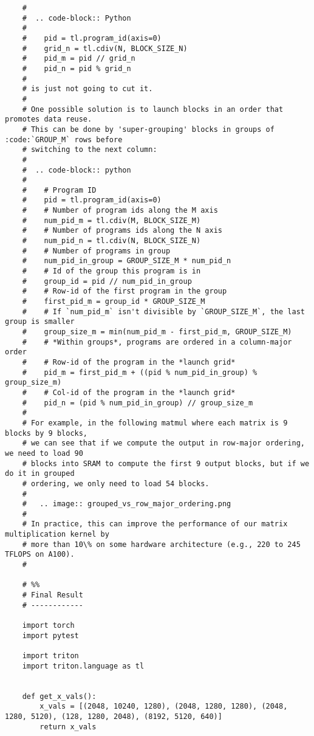 \documentclass{article}
\begin{document}
\begin{lstlisting}
    #
    #  .. code-block:: Python
    #
    #    pid = tl.program_id(axis=0)
    #    grid_n = tl.cdiv(N, BLOCK_SIZE_N)
    #    pid_m = pid // grid_n
    #    pid_n = pid % grid_n
    #
    # is just not going to cut it.
    #
    # One possible solution is to launch blocks in an order that promotes data reuse.
    # This can be done by 'super-grouping' blocks in groups of :code:`GROUP_M` rows before
    # switching to the next column:
    #
    #  .. code-block:: python
    #
    #    # Program ID
    #    pid = tl.program_id(axis=0)
    #    # Number of program ids along the M axis
    #    num_pid_m = tl.cdiv(M, BLOCK_SIZE_M)
    #    # Number of programs ids along the N axis
    #    num_pid_n = tl.cdiv(N, BLOCK_SIZE_N)
    #    # Number of programs in group
    #    num_pid_in_group = GROUP_SIZE_M * num_pid_n
    #    # Id of the group this program is in
    #    group_id = pid // num_pid_in_group
    #    # Row-id of the first program in the group
    #    first_pid_m = group_id * GROUP_SIZE_M
    #    # If `num_pid_m` isn't divisible by `GROUP_SIZE_M`, the last group is smaller
    #    group_size_m = min(num_pid_m - first_pid_m, GROUP_SIZE_M)
    #    # *Within groups*, programs are ordered in a column-major order
    #    # Row-id of the program in the *launch grid*
    #    pid_m = first_pid_m + ((pid % num_pid_in_group) % group_size_m)
    #    # Col-id of the program in the *launch grid*
    #    pid_n = (pid % num_pid_in_group) // group_size_m
    #
    # For example, in the following matmul where each matrix is 9 blocks by 9 blocks,
    # we can see that if we compute the output in row-major ordering, we need to load 90
    # blocks into SRAM to compute the first 9 output blocks, but if we do it in grouped
    # ordering, we only need to load 54 blocks.
    #
    #   .. image:: grouped_vs_row_major_ordering.png
    #
    # In practice, this can improve the performance of our matrix multiplication kernel by
    # more than 10\% on some hardware architecture (e.g., 220 to 245 TFLOPS on A100).
    #

    # %%
    # Final Result
    # ------------

    import torch
    import pytest

    import triton
    import triton.language as tl


    def get_x_vals():
        x_vals = [(2048, 10240, 1280), (2048, 1280, 1280), (2048, 1280, 5120), (128, 1280, 2048), (8192, 5120, 640)]
        return x_vals


\end{lstlisting}
\end{document}
